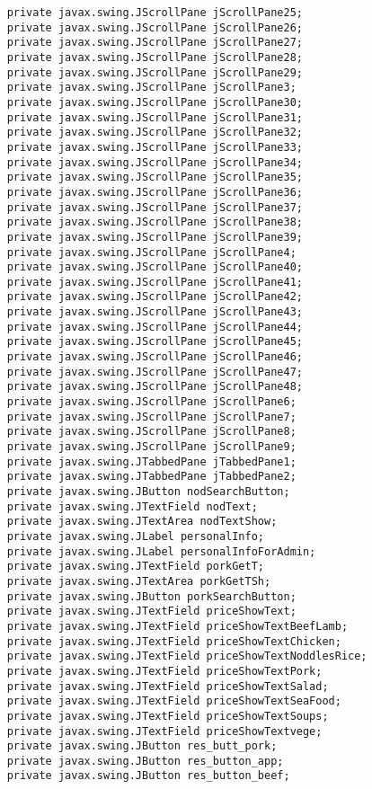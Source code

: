 \documentclass[12pt,a4paper]{article}
\begin{document}
\begin{lstlisting}
    private javax.swing.JScrollPane jScrollPane25;
    private javax.swing.JScrollPane jScrollPane26;
    private javax.swing.JScrollPane jScrollPane27;
    private javax.swing.JScrollPane jScrollPane28;
    private javax.swing.JScrollPane jScrollPane29;
    private javax.swing.JScrollPane jScrollPane3;
    private javax.swing.JScrollPane jScrollPane30;
    private javax.swing.JScrollPane jScrollPane31;
    private javax.swing.JScrollPane jScrollPane32;
    private javax.swing.JScrollPane jScrollPane33;
    private javax.swing.JScrollPane jScrollPane34;
    private javax.swing.JScrollPane jScrollPane35;
    private javax.swing.JScrollPane jScrollPane36;
    private javax.swing.JScrollPane jScrollPane37;
    private javax.swing.JScrollPane jScrollPane38;
    private javax.swing.JScrollPane jScrollPane39;
    private javax.swing.JScrollPane jScrollPane4;
    private javax.swing.JScrollPane jScrollPane40;
    private javax.swing.JScrollPane jScrollPane41;
    private javax.swing.JScrollPane jScrollPane42;
    private javax.swing.JScrollPane jScrollPane43;
    private javax.swing.JScrollPane jScrollPane44;
    private javax.swing.JScrollPane jScrollPane45;
    private javax.swing.JScrollPane jScrollPane46;
    private javax.swing.JScrollPane jScrollPane47;
    private javax.swing.JScrollPane jScrollPane48;
    private javax.swing.JScrollPane jScrollPane6;
    private javax.swing.JScrollPane jScrollPane7;
    private javax.swing.JScrollPane jScrollPane8;
    private javax.swing.JScrollPane jScrollPane9;
    private javax.swing.JTabbedPane jTabbedPane1;
    private javax.swing.JTabbedPane jTabbedPane2;
    private javax.swing.JButton nodSearchButton;
    private javax.swing.JTextField nodText;
    private javax.swing.JTextArea nodTextShow;
    private javax.swing.JLabel personalInfo;
    private javax.swing.JLabel personalInfoForAdmin;
    private javax.swing.JTextField porkGetT;
    private javax.swing.JTextArea porkGetTSh;
    private javax.swing.JButton porkSearchButton;
    private javax.swing.JTextField priceShowText;
    private javax.swing.JTextField priceShowTextBeefLamb;
    private javax.swing.JTextField priceShowTextChicken;
    private javax.swing.JTextField priceShowTextNoddlesRice;
    private javax.swing.JTextField priceShowTextPork;
    private javax.swing.JTextField priceShowTextSalad;
    private javax.swing.JTextField priceShowTextSeaFood;
    private javax.swing.JTextField priceShowTextSoups;
    private javax.swing.JTextField priceShowTextvege;
    private javax.swing.JButton res_butt_pork;
    private javax.swing.JButton res_button_app;
    private javax.swing.JButton res_button_beef;

\end{lstlisting}
\end{document}
